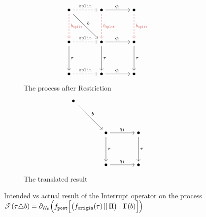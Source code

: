 \documentclass[../hons_project.tex]{subfiles}
\begin{document}
\begin{figure}[H]
	\centering
	\begin{subfigure}[b]{0.45\textwidth}
		\[\begin{tikzcd}[cramped, column sep=scriptsize]
				\bullet && \bullet && \bullet \\
				\\
				\bullet && \bullet && \bullet \\
				\\
				\bullet && \bullet && \bullet
				\arrow["{\mathtt{split}}", color={rgb,255:red,110;green,110;blue,110}, dashed, from=1-1, to=1-3]
				\arrow["{b_{\mathtt{split}}}", color={rgb,255:red,214;green,92;blue,92}, dashed, from=1-1, to=3-1]
				\arrow["b", from=1-1, to=3-3]
				\arrow["{q_1}", from=1-3, to=1-5]
				\arrow["{b_{\mathtt{split}}}", color={rgb,255:red,214;green,92;blue,92}, dashed, from=1-3, to=3-3]
				\arrow["{b_{\mathtt{split}}}", color={rgb,255:red,214;green,92;blue,92}, dashed, from=1-5, to=3-5]
				\arrow["{\mathtt{split}}", color={rgb,255:red,110;green,110;blue,110}, dashed, from=3-1, to=3-3]
				\arrow["\tau", from=3-1, to=5-1]
				\arrow["{q_1}", from=3-3, to=3-5]
				\arrow["\tau", from=3-3, to=5-3]
				\arrow["\tau", from=3-5, to=5-5]
				\arrow["{\mathtt{split}}", color={rgb,255:red,110;green,110;blue,110}, dashed, from=5-1, to=5-3]
				\arrow["{q_1}", from=5-3, to=5-5]
			\end{tikzcd}\]
		\caption{The process after Restriction}
	\end{subfigure}\hfill
	\begin{subfigure}[b]{0.45\textwidth}
		\[\begin{tikzcd}[cramped, column sep=scriptsize]
				\bullet \\
				\\
				&& \bullet && \bullet \\
				\\
				&& \bullet && \bullet
				\arrow["b", from=1-1, to=3-3]
				\arrow["{q_1}", from=3-3, to=3-5]
				\arrow["\tau", from=3-3, to=5-3]
				\arrow["\tau", from=3-5, to=5-5]
				\arrow["{q_1}", from=5-3, to=5-5]
			\end{tikzcd}\]
		\caption{The translated result}
	\end{subfigure}
	\caption{Intended vs actual result of the Interrupt operator on the process \newline$\mathscr{T}(\tau \triangle b) = \partial_{H_{0}}\Bigl(f_{\mathtt{post}}\Bigl[ \bigl(f_{\mathtt{origin}}(\tau) \,\vert\vert\, \Pi\bigr) \,\vert\vert\, \Gamma(b) \Bigr]\Bigr)$}
\end{figure}
\end{document}
